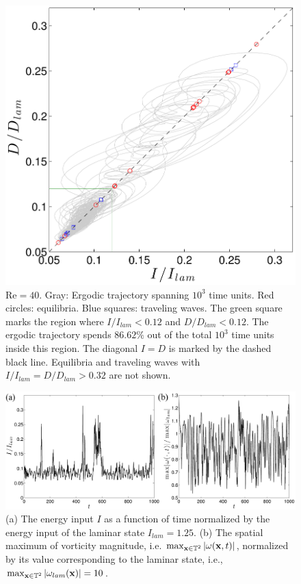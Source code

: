 \documentclass{article}
\begin{document}
\begin{figure}
\centering
\includegraphics[width=.75\textwidth]{ID_R40}		
\caption{$\mbox{Re}=40$. Gray: Ergodic trajectory spanning $10^3$ time units.
Red circles: equilibria.
Blue squares: traveling waves.
The green square marks the region where $I/I_{lam}<0.12$ and $D/D_{lam}<0.12$.
The ergodic trajectory spends $86.62\%$ out of the total $10^3$ time units inside this region.
The diagonal $I=D$ is marked by the dashed black line.
Equilibria and traveling waves with $I/I_{lam}=D/D_{lam}>0.32$ are not shown.
}
\label{fig:ID_R40}
\end{figure}
%
\begin{figure}
\centering
\includegraphics[width=\textwidth]{It}
\caption{(a) The energy input $I$ as a function of time normalized by the energy
input of the laminar state $I_{lam}=1.25$.
(b) The spatial maximum of
vorticity magnitude, i.e. $\max_{\mathbf x\in\mathbb T^2}|\omega(\mathbf x,t)|$, normalized by its value
corresponding to the laminar state, i.e.,
$\max_{\mathbf x\in\mathbb T^2}|\omega_{lam}(\mathbf x)|=10$.
}
\label{fig:It}
\end{figure}
\end{document}

